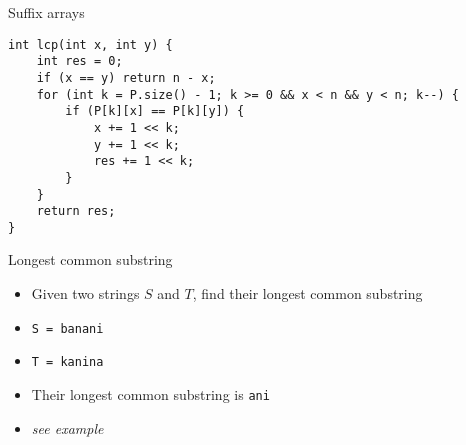 \documentclass[12pt,t]{beamer}
\newcommand{\bi}{\begin{itemize}}
\newcommand{\ei}{\end{itemize}}
\begin{document}
\begin{frame}[fragile]{Suffix arrays}
    \begin{verbatim}
int lcp(int x, int y) {
    int res = 0;
    if (x == y) return n - x;
    for (int k = P.size() - 1; k >= 0 && x < n && y < n; k--) {
        if (P[k][x] == P[k][y]) {
            x += 1 << k;
            y += 1 << k;
            res += 1 << k;
        }
    }
    return res;
}
\end{verbatim}
\end{frame}

\begin{frame}{Longest common substring}
    \vspace{30pt}
    \bi
        \item Given two strings $S$ and $T$, find their longest common substring
            \vspace{10pt}
        \item \texttt{S = banani}
        \item \texttt{T = kanina}
            \vspace{10pt}
        \item Their longest common substring is \texttt{ani}
            \vspace{20pt}
        \item \textit{see example}
    \ei
\end{frame}
\end{document}
